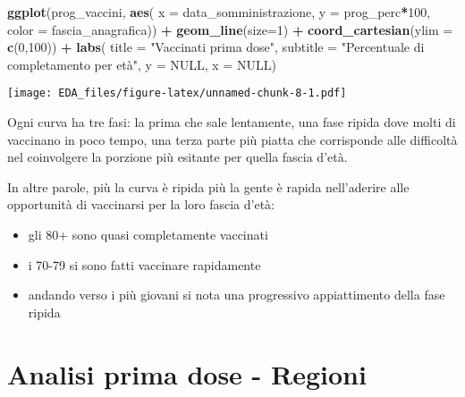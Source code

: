\documentclass[]{article}
\newenvironment{Shaded}{\begin{snugshade}}{\end{snugshade}}
\newcommand{\KeywordTok}[1]{\textcolor[rgb]{0.13,0.29,0.53}{\textbf{#1}}}
\newcommand{\DataTypeTok}[1]{\textcolor[rgb]{0.13,0.29,0.53}{#1}}
\newcommand{\DecValTok}[1]{\textcolor[rgb]{0.00,0.00,0.81}{#1}}
\newcommand{\StringTok}[1]{\textcolor[rgb]{0.31,0.60,0.02}{#1}}
\newcommand{\OtherTok}[1]{\textcolor[rgb]{0.56,0.35,0.01}{#1}}
\newcommand{\OperatorTok}[1]{\textcolor[rgb]{0.81,0.36,0.00}{\textbf{#1}}}
\newcommand{\NormalTok}[1]{#1}
\providecommand{\tightlist}{%
  \setlength{\itemsep}{0pt}\setlength{\parskip}{0pt}}
\begin{document}
\begin{Shaded}
\begin{Highlighting}[]
\KeywordTok{ggplot}\NormalTok{(prog_vaccini, }
       \KeywordTok{aes}\NormalTok{( }\DataTypeTok{x =}\NormalTok{ data_somministrazione,}
            \DataTypeTok{y =}\NormalTok{ prog_perc}\OperatorTok{*}\DecValTok{100}\NormalTok{,}
            \DataTypeTok{color =}\NormalTok{ fascia_anagrafica)) }\OperatorTok{+}
\StringTok{  }\KeywordTok{geom_line}\NormalTok{(}\DataTypeTok{size=}\DecValTok{1}\NormalTok{) }\OperatorTok{+}
\StringTok{  }\KeywordTok{coord_cartesian}\NormalTok{(}\DataTypeTok{ylim =} \KeywordTok{c}\NormalTok{(}\DecValTok{0}\NormalTok{,}\DecValTok{100}\NormalTok{)) }\OperatorTok{+}
\StringTok{  }\KeywordTok{labs}\NormalTok{( }\DataTypeTok{title =} \StringTok{"Vaccinati prima dose"}\NormalTok{,}
        \DataTypeTok{subtitle =} \StringTok{"Percentuale di completamento per età"}\NormalTok{,}
        \DataTypeTok{y =} \OtherTok{NULL}\NormalTok{,}
        \DataTypeTok{x =} \OtherTok{NULL}\NormalTok{)}
\end{Highlighting}
\end{Shaded}

\texttt{[image: EDA\_files/figure-latex/unnamed-chunk-8-1.pdf]}

Ogni curva ha tre fasi: la prima che sale lentamente, una fase ripida
dove molti di vaccinano in poco tempo, una terza parte più piatta che
corrisponde alle difficoltà nel coinvolgere la porzione più esitante per
quella fascia d'età.

In altre parole, più la curva è ripida più la gente è rapida
nell'aderire alle opportunità di vaccinarsi per la loro fascia d'età:

\begin{itemize}
\tightlist
\item
  gli 80+ sono quasi completamente vaccinati
\item
  i 70-79 si sono fatti vaccinare rapidamente
\item
  andando verso i più giovani si nota una progressivo appiattimento
  della fase ripida
\end{itemize}

\section{Analisi prima dose -
Regioni}\label{analisi-prima-dose---regioni}
\end{document}
